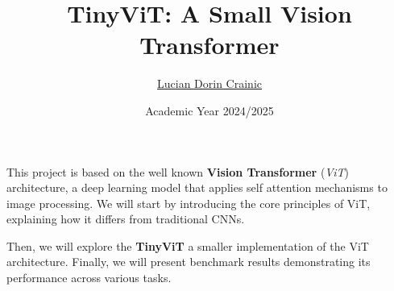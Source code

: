 \documentclass{beamer}
\title{TinyViT: A Small Vision Transformer}
\author{\href{mailto:crainic1938430@studenti.uniroma1.it}{Lucian Dorin Crainic}}
\date{Academic Year 2024/2025}
\begin{document}
\maketitle

\begin{frame}

  This project is based on the well known \textbf{Vision Transformer} (\textit{ViT}) architecture, a deep learning model that applies self attention mechanisms to image processing. We will start by introducing the core principles of ViT, explaining how it differs from traditional CNNs.

  \vspace{\baselineskip}

  Then, we will explore the \textbf{TinyViT} a smaller implementation of the ViT architecture. Finally, we will present benchmark results demonstrating its performance across various tasks.

\end{frame}



\backmatter
\end{document}
